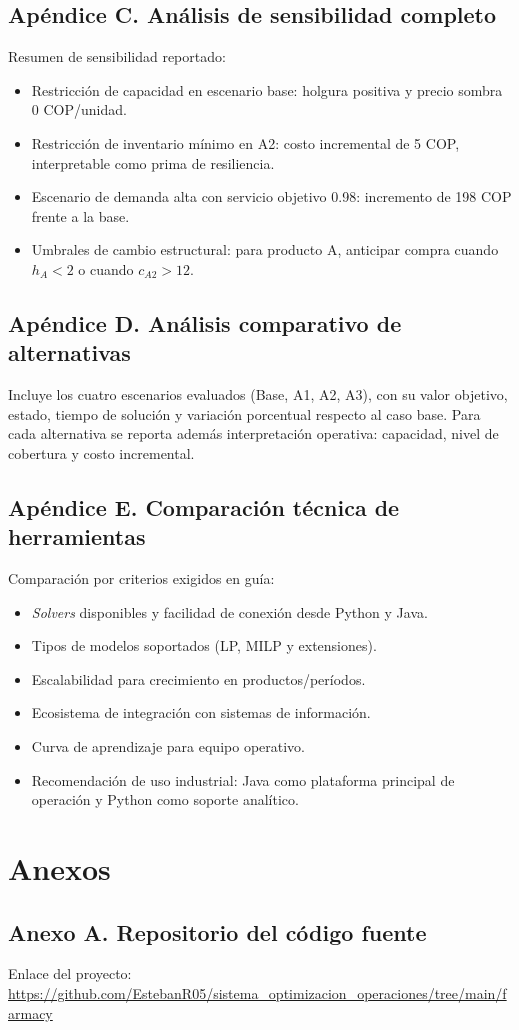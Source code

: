 \documentclass[12pt,letterpaper]{article}
\begin{document}
\subsection*{Apéndice C. Análisis de sensibilidad completo}
Resumen de sensibilidad reportado:
\begin{itemize}[leftmargin=*]
	\item Restricción de capacidad en escenario base: holgura positiva y precio sombra 0 COP/unidad.
	\item Restricción de inventario mínimo en A2: costo incremental de 5 COP, interpretable como prima de resiliencia.
	\item Escenario de demanda alta con servicio objetivo 0.98: incremento de 198 COP frente a la base.
	\item Umbrales de cambio estructural: para producto A, anticipar compra cuando $h_A<2$ o cuando $c_{A2}>12$.
\end{itemize}

\subsection*{Apéndice D. Análisis comparativo de alternativas}
Incluye los cuatro escenarios evaluados (Base, A1, A2, A3), con su valor objetivo, estado, tiempo de solución y variación porcentual respecto al caso base. Para cada alternativa se reporta además interpretación operativa: capacidad, nivel de cobertura y costo incremental.

\subsection*{Apéndice E. Comparación técnica de herramientas}
Comparación por criterios exigidos en guía:
\begin{itemize}[leftmargin=*]
	\item \textit{Solvers} disponibles y facilidad de conexión desde Python y Java.
	\item Tipos de modelos soportados (LP, MILP y extensiones).
	\item Escalabilidad para crecimiento en productos/períodos.
	\item Ecosistema de integración con sistemas de información.
	\item Curva de aprendizaje para equipo operativo.
	\item Recomendación de uso industrial: Java como plataforma principal de operación y Python como soporte analítico.
\end{itemize}

\clearpage
\section{Anexos}

\subsection*{Anexo A. Repositorio del código fuente}
\noindent Enlace del proyecto: \url{https://github.com/EstebanR05/sistema_optimizacion_operaciones/tree/main/farmacy}
\end{document}
